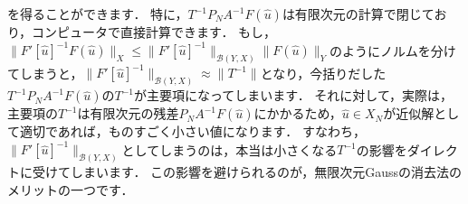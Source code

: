 を得ることができます．
特に，$T^{-1} P_N A^{-1} F( \hat{u} )$は有限次元の計算で閉じており，コンピュータで直接計算できます．
もし，$\| F'[\hat{u}]^{-1} F(\hat{u}) \|_{X} \le \| F'[\hat{u}]^{-1} \|_{{\mathcal B(Y,X)}} \| F(\hat{u}) \|_{Y}$のようにノルムを分けてしまうと，$ \| F'[\hat{u}]^{-1} \|_{{\mathcal B(Y,X)}} \approx \| T^{-1} \|$となり，今括りだした$T^{-1} P_N A^{-1} F( \hat{u} )$の$T^{-1}$が主要項になってしまいます．
それに対して，実際は，主要項の$T^{-1}$は有限次元の残差$P_N A^{-1} F( \hat{u} )$にかかるため，$\hat{u} \in X_N$が近似解として適切であれば，ものすごく小さい値になります．
すなわち，$\| F'[\hat{u}]^{-1} \|_{{\mathcal B(Y,X)}}$としてしまうのは，本当は小さくなる$T^{-1}$の影響をダイレクトに受けてしまいます．
この影響を避けられるのが，無限次元Gaussの消去法のメリットの一つです．

